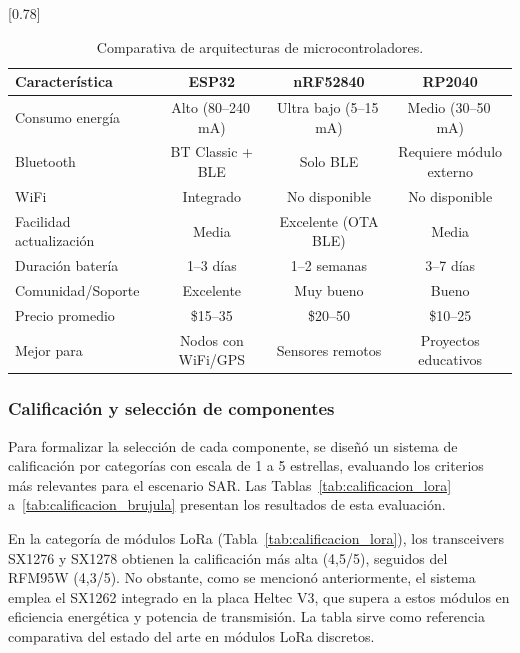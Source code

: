\begin{table}[H]
\begin{center}
\caption{Comparativa de arquitecturas de microcontroladores.}
\scalebox{0.78}[0.78]{
\begin{tabular}{| l | c | c | c |}
\hline
 \textbf{Característica} & \textbf{ESP32} & \textbf{nRF52840} & \textbf{RP2040} \\
\hline
\hline
 Consumo energía & Alto (80--240\,mA) & Ultra bajo (5--15\,mA) & Medio (30--50\,mA) \\
 Bluetooth & BT Classic + BLE & Solo BLE & Requiere módulo externo \\
 WiFi & Integrado & No disponible & No disponible \\
 Facilidad actualización & Media & Excelente (OTA BLE) & Media \\
 Duración batería & 1--3 días & 1--2 semanas & 3--7 días \\
 Comunidad/Soporte & Excelente & Muy bueno & Bueno \\
 Precio promedio & \$15--35 & \$20--50 & \$10--25 \\
 Mejor para & Nodos con WiFi/GPS & Sensores remotos & Proyectos educativos \\
\hline
\end{tabular}}
\label{tab:comparativa_arquitecturas}
\end{center}
\end{table}

\subsubsection{Calificación y selección de componentes}

Para formalizar la selección de cada componente, se diseñó un sistema de calificación por categorías con escala de 1 a 5 estrellas, evaluando los criterios más relevantes para el escenario SAR. Las Tablas~\ref{tab:calificacion_lora} a~\ref{tab:calificacion_brujula} presentan los resultados de esta evaluación.

En la categoría de módulos LoRa (Tabla~\ref{tab:calificacion_lora}), los transceivers SX1276 y SX1278 obtienen la calificación más alta (4,5/5), seguidos del RFM95W (4,3/5). No obstante, como se mencionó anteriormente, el sistema emplea el SX1262 integrado en la placa Heltec V3, que supera a estos módulos en eficiencia energética y potencia de transmisión. La tabla sirve como referencia comparativa del estado del arte en módulos LoRa discretos.

